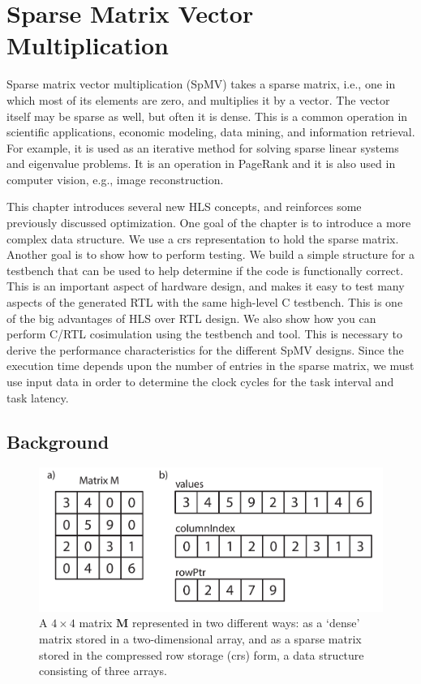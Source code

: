 
\chapter{Sparse Matrix Vector Multiplication}
\glsresetall
\label{chapter:spmv}

Sparse matrix vector multiplication (SpMV) takes a sparse matrix, i.e., one in which most of its elements  are zero, and multiplies it by a vector. The vector itself may be sparse as well, but often it is dense. This is a common operation in scientific applications, economic modeling, data mining, and information retrieval. For example, it is used as an iterative method for solving sparse linear systems and eigenvalue problems. It is an operation in PageRank and it is also used in computer vision, e.g., image reconstruction.

This chapter introduces several new HLS concepts, and reinforces some previously discussed optimization. One goal of the chapter is to introduce a more complex data structure. We use a \gls{crs} representation to hold the sparse matrix. Another goal is to show how to perform testing. We build a simple structure for a testbench that can be used to help determine if the code is functionally correct. This is an important aspect of hardware design, and \VHLS makes it easy to test many aspects of the generated RTL with the same high-level C testbench. This is one of the big advantages of HLS over RTL design. We also show how you can perform C/RTL cosimulation using the testbench and \VHLS tool. This is necessary to derive the performance characteristics for the different SpMV designs. Since the execution time depends upon the number of entries in the sparse matrix, we must use input data in order to determine the clock cycles for the task interval and task latency.

\section{Background}

\begin{figure}
\centering
\includegraphics[width=  .65\textwidth]{images/crs}
\caption{A $4 \times 4$ matrix $\mathbf{M}$ represented in two different ways: as a `dense' matrix stored in a two-dimensional array, and as a sparse matrix stored in the compressed row storage (\gls{crs}) form, a data structure consisting of three arrays. }
\label{fig:crs}
\end{figure}

